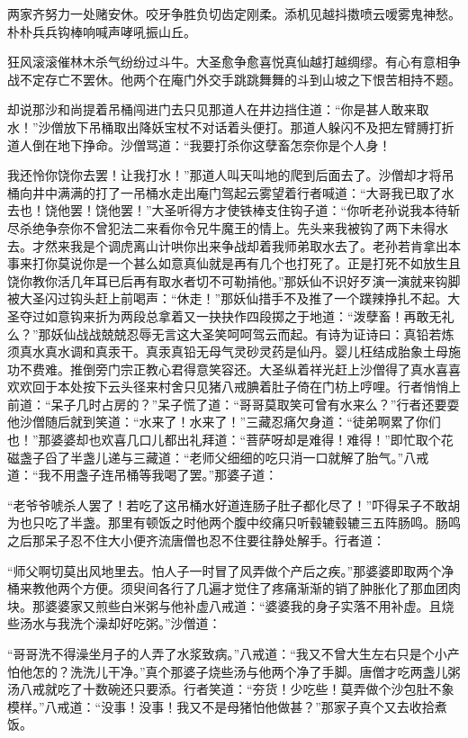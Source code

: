 \documentclass[12pt,UTF8]{ctexbook}
\begin{document}
{两家齐努力一处赌安休。咬牙争胜负切齿定刚柔。添机见越抖擞喷云嗳雾鬼神愁。朴朴兵兵钩棒响喊声哮吼振山丘。

狂风滚滚催林木杀气纷纷过斗牛。大圣愈争愈喜悦真仙越打越绸缪。有心有意相争战不定存亡不罢休。他两个在庵门外交手跳跳舞舞的斗到山坡之下恨苦相持不题。

却说那沙和尚提着吊桶闯进门去只见那道人在井边挡住道：“你是甚人敢来取水！”沙僧放下吊桶取出降妖宝杖不对话着头便打。那道人躲闪不及把左臂膊打折道人倒在地下挣命。沙僧骂道：“我要打杀你这孽畜怎奈你是个人身！

我还怜你饶你去罢！让我打水！”那道人叫天叫地的爬到后面去了。沙僧却才将吊桶向井中满满的打了一吊桶水走出庵门驾起云雾望着行者喊道：“大哥我已取了水去也！饶他罢！饶他罢！”大圣听得方才使铁棒支住钩子道：“你听老孙说我本待斩尽杀绝争奈你不曾犯法二来看你令兄牛魔王的情上。先头来我被钩了两下未得水去。才然来我是个调虎离山计哄你出来争战却着我师弟取水去了。老孙若肯拿出本事来打你莫说你是一个甚么如意真仙就是再有几个也打死了。正是打死不如放生且饶你教你活几年耳已后再有取水者切不可勒掯他。”那妖仙不识好歹演一演就来钩脚被大圣闪过钩头赶上前喝声：“休走！”那妖仙措手不及推了一个蹼辣挣扎不起。大圣夺过如意钩来折为两段总拿着又一抉抉作四段掷之于地道：“泼孽畜！再敢无礼么？”那妖仙战战兢兢忍辱无言这大圣笑呵呵驾云而起。有诗为证诗曰：真铅若炼须真水真水调和真汞干。真汞真铅无母气灵砂灵药是仙丹。婴儿枉结成胎象土母施功不费难。推倒旁门宗正教心君得意笑容还。大圣纵着祥光赶上沙僧得了真水喜喜欢欢回于本处按下云头径来村舍只见猪八戒腆着肚子倚在门枋上哼哩。行者悄悄上前道：“呆子几时占房的？”呆子慌了道：“哥哥莫取笑可曾有水来么？”行者还要耍他沙僧随后就到笑道：“水来了！水来了！”三藏忍痛欠身道：“徒弟啊累了你们也！”那婆婆却也欢喜几口儿都出礼拜道：“菩萨呀却是难得！难得！”即忙取个花磁盏子舀了半盏儿递与三藏道：“老师父细细的吃只消一口就解了胎气。”八戒道：“我不用盏子连吊桶等我喝了罢。”那婆子道：

“老爷爷唬杀人罢了！若吃了这吊桶水好道连肠子肚子都化尽了！”吓得呆子不敢胡为也只吃了半盏。那里有顿饭之时他两个腹中绞痛只听毂辘毂辘三五阵肠鸣。肠鸣之后那呆子忍不住大小便齐流唐僧也忍不住要往静处解手。行者道：

“师父啊切莫出风地里去。怕人子一时冒了风弄做个产后之疾。”那婆婆即取两个净桶来教他两个方便。须臾间各行了几遍才觉住了疼痛渐渐的销了肿胀化了那血团肉块。那婆婆家又煎些白米粥与他补虚八戒道：“婆婆我的身子实落不用补虚。且烧些汤水与我洗个澡却好吃粥。”沙僧道：

“哥哥洗不得澡坐月子的人弄了水浆致病。”八戒道：“我又不曾大生左右只是个小产怕他怎的？洗洗儿干净。”真个那婆子烧些汤与他两个净了手脚。唐僧才吃两盏儿粥汤八戒就吃了十数碗还只要添。行者笑道：“夯货！少吃些！莫弄做个沙包肚不象模样。”八戒道：“没事！没事！我又不是母猪怕他做甚？”那家子真个又去收拾煮饭。

}
\end{document}
